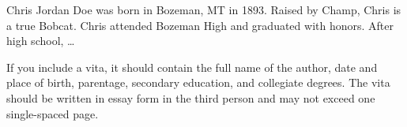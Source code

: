 
Chris Jordan Doe was born in Bozeman, MT in 1893.  Raised by Champ, Chris is a true Bobcat. Chris attended Bozeman High and graduated with honors. After high school, \dots

If you include a vita, it should contain the full name of the author, date and place of birth, parentage, secondary education, and collegiate degrees. The vita should be written in essay form in the third person and may not exceed one single-spaced page.

